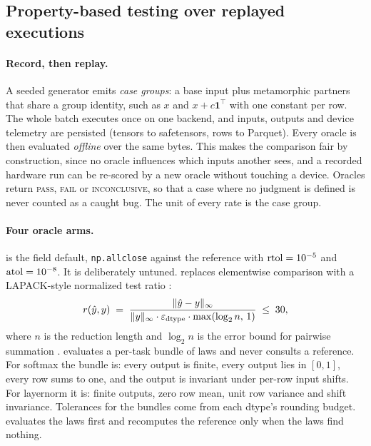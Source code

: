 \subsection{Property-based testing over replayed executions}
\label{sec:pbt}

\paragraph{Record, then replay.}
A seeded generator emits \emph{case groups}: a base input plus metamorphic partners
that share a group identity, such as $x$ and $x + c\mathbf{1}^\top$ with one constant
per row. The whole batch executes once on one backend, and inputs, outputs and device
telemetry are persisted (tensors to safetensors, rows to Parquet). Every oracle is then
evaluated \emph{offline} over the same bytes. This makes the comparison fair by
construction, since no oracle influences which inputs another sees, and a recorded hardware run
can be re-scored by a new oracle without touching a device. Oracles return
\textsc{pass}, \textsc{fail} or \textsc{inconclusive}, so that a case where no
judgment is defined is never counted as a caught bug. The unit of every rate is the
case group.

\paragraph{Four oracle arms.}
\allclose is the field default, \texttt{np.allclose} against the reference with
$\mathrm{rtol}=10^{-5}$ and $\mathrm{atol}=10^{-8}$. It is deliberately
untuned. \RefArm replaces elementwise comparison with a LAPACK-style normalized test ratio
\citep{anderson1992lawn41}:
\begin{equation}
  r(\hat y, y) \;=\; \frac{\lVert \hat y - y \rVert_\infty}
       {\lVert y \rVert_\infty \cdot \varepsilon_{\text{dtype}} \cdot \max(\log_2 n,\, 1)}
  \;\le\; 30,
  \label{eq:ratio}
\end{equation}
where $n$ is the reduction length and $\log_2 n$ is the error bound for pairwise
summation \citep{higham2002accuracy}. \DeclArm evaluates a per-task bundle of laws and never
consults a reference. For softmax the bundle is: every output is finite, every output
lies in $[0,1]$, every row sums to one, and the output is invariant under per-row input
shifts. For layernorm it is: finite outputs, zero row mean, unit row variance and shift
invariance. Tolerances for the bundles come from each dtype's rounding budget. \HybArm
evaluates the laws first and recomputes the reference only when the laws find nothing.


